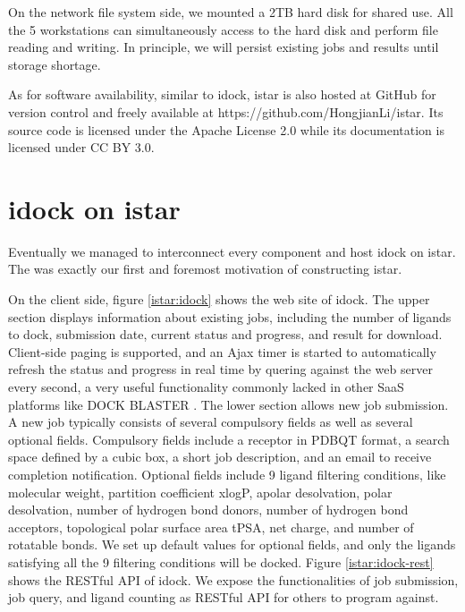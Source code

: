 On the network file system side, we mounted a 2TB hard disk for shared use. All the 5 workstations can simultaneously access to the hard disk and perform file reading and writing. In principle, we will persist existing jobs and results until storage shortage.

As for software availability, similar to idock, istar is also hosted at GitHub for version control and freely available at https://github.com/HongjianLi/istar. Its source code is licensed under the Apache License 2.0 while its documentation is licensed under CC BY 3.0.

\section{idock on istar}

Eventually we managed to interconnect every component and host idock \citep{1153} on istar. The was exactly our first and foremost motivation of constructing istar.

On the client side, figure \ref{istar:idock} shows the web site of idock. The upper section displays information about existing jobs, including the number of ligands to dock, submission date, current status and progress, and result for download. Client-side paging is supported, and an Ajax timer is started to automatically refresh the status and progress in real time by quering against the web server every second, a very useful functionality commonly lacked in other SaaS platforms like DOCK BLASTER \citep{557}. The lower section allows new job submission. A new job typically consists of several compulsory fields as well as several optional fields. Compulsory fields include a receptor in PDBQT format, a search space defined by a cubic box, a short job description, and an email to receive completion notification. Optional fields include 9 ligand filtering conditions, like molecular weight, partition coefficient xlogP, apolar desolvation, polar desolvation, number of hydrogen bond donors, number of hydrogen bond acceptors, topological polar surface area tPSA, net charge, and number of rotatable bonds. We set up default values for optional fields, and only the ligands satisfying all the 9 filtering conditions will be docked. Figure \ref{istar:idock-rest} shows the RESTful API of idock. We expose the functionalities of job submission, job query, and ligand counting as RESTful API for others to program against.

